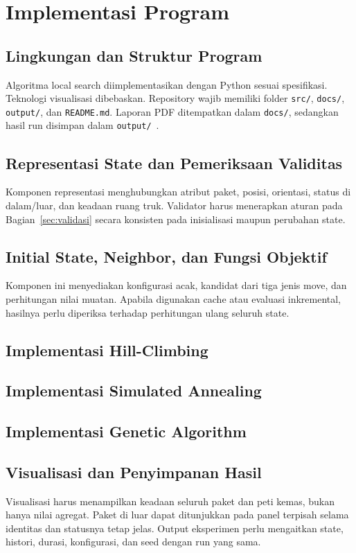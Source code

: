 \section{Implementasi Program}
\subsection{Lingkungan dan Struktur Program}
Algoritma local search diimplementasikan dengan Python sesuai spesifikasi.
Teknologi visualisasi dibebaskan. Repository wajib memiliki folder
\texttt{src/}, \texttt{docs/}, \texttt{output/}, dan \texttt{README.md}.
Laporan PDF ditempatkan dalam \texttt{docs/}, sedangkan hasil run disimpan
dalam \texttt{output/}~\cite{spesifikasi}.


\subsection{Representasi State dan Pemeriksaan Validitas}
Komponen representasi menghubungkan atribut paket, posisi, orientasi, status
di dalam/luar, dan keadaan ruang truk. Validator harus menerapkan aturan pada
Bagian~\ref{sec:validasi} secara konsisten pada inisialisasi maupun perubahan state.


\subsection{Initial State, Neighbor, dan Fungsi Objektif}
Komponen ini menyediakan konfigurasi acak, kandidat dari tiga jenis move,
dan perhitungan nilai muatan. Apabila digunakan cache atau evaluasi
inkremental, hasilnya perlu diperiksa terhadap perhitungan ulang seluruh state.


\subsection{Implementasi Hill-Climbing}


\subsection{Implementasi Simulated Annealing}


\subsection{Implementasi Genetic Algorithm}


\subsection{Visualisasi dan Penyimpanan Hasil}
Visualisasi harus menampilkan keadaan seluruh paket dan peti kemas, bukan
hanya nilai agregat. Paket di luar dapat ditunjukkan pada panel terpisah
selama identitas dan statusnya tetap jelas. Output eksperimen perlu mengaitkan
state, histori, durasi, konfigurasi, dan seed dengan run yang sama.
